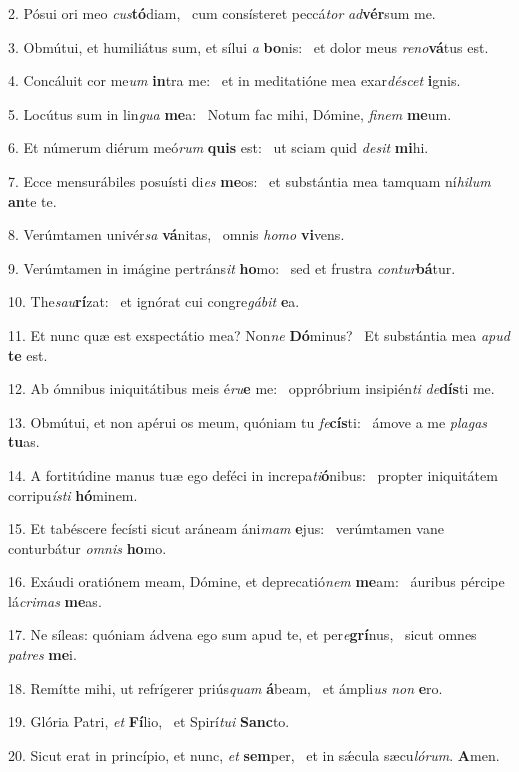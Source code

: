 2. Pósui ori meo \textit{cus}\textbf{tó}diam, \ast\  cum consísteret peccá\textit{tor} \textit{ad}\textbf{vér}sum me.\

3. Obmútui, et humiliátus sum, et sílui \textit{a} \textbf{bo}nis: \ast\  et dolor meus \textit{re}\textit{no}\textbf{vá}tus est.\

4. Concáluit cor me\textit{um} \textbf{in}tra me: \ast\  et in meditatióne mea exar\textit{dé}\textit{scet} \textbf{i}gnis.\

5. Locútus sum in lin\textit{gua} \textbf{me}a: \ast\  Notum fac mihi, Dómine, \textit{fi}\textit{nem} \textbf{me}um.\

6. Et númerum diérum meó\textit{rum} \textbf{quis} est: \ast\  ut sciam quid \textit{de}\textit{sit} \textbf{mi}hi.\

7. Ecce mensurábiles posuísti di\textit{es} \textbf{me}os: \ast\  et substántia mea tamquam ní\textit{hi}\textit{lum} \textbf{an}te te.\

8. Verúmtamen univér\textit{sa} \textbf{vá}nitas, \ast\  omnis \textit{ho}\textit{mo} \textbf{vi}vens.\

9. Verúmtamen in imágine pertráns\textit{it} \textbf{ho}mo: \ast\  sed et frustra \textit{con}\textit{tur}\textbf{bá}tur.\

10. The\textit{sau}\textbf{rí}zat: \ast\  et ignórat cui congre\textit{gá}\textit{bit} \textbf{e}a.\

11. Et nunc quæ est exspectátio mea? Non\textit{ne} \textbf{Dó}minus? \ast\  Et substántia mea \textit{a}\textit{pud} \textbf{te} est.\

12. Ab ómnibus iniquitátibus meis é\textit{ru}\textbf{e} me: \ast\  oppróbrium insipién\textit{ti} \textit{de}\textbf{dís}ti me.\

13. Obmútui, et non apérui os meum, quóniam tu \textit{fe}\textbf{cís}ti: \ast\  ámove a me \textit{pla}\textit{gas} \textbf{tu}as.\

14. A fortitúdine manus tuæ ego deféci in increpa\textit{ti}\textbf{ó}nibus: \ast\  propter iniquitátem corripu\textit{ís}\textit{ti} \textbf{hó}minem.\

15. Et tabéscere fecísti sicut aráneam áni\textit{mam} \textbf{e}jus: \ast\  verúmtamen vane conturbátur \textit{om}\textit{nis} \textbf{ho}mo.\

16. Exáudi oratiónem meam, Dómine, et deprecatió\textit{nem} \textbf{me}am: \ast\  áuribus pércipe lá\textit{cri}\textit{mas} \textbf{me}as.\

17. Ne síleas: quóniam ádvena ego sum apud te, et per\textit{e}\textbf{grí}nus, \ast\  sicut omnes \textit{pa}\textit{tres} \textbf{me}i.\

18. Remítte mihi, ut refrígerer priús\textit{quam} \textbf{á}beam, \ast\  et ámpli\textit{us} \textit{non} \textbf{e}ro.\

19. Glória Patri, \textit{et} \textbf{Fí}lio, \ast\  et Spirí\textit{tu}\textit{i} \textbf{Sanc}to.\

20. Sicut erat in princípio, et nunc, \textit{et} \textbf{sem}per, \ast\  et in sǽcula sæcu\textit{ló}\textit{rum}. \textbf{A}men.\

